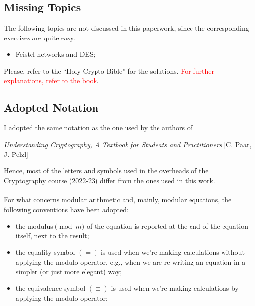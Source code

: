\documentclass[11pt, a4paper]{article}
\newcommand{\doublequotes}[1]{“#1”}
\begin{document}
\subsection*{Missing Topics}
The following topics are not discussed in this paperwork, since the corresponding exercises are quite easy:
\begin{itemize}
    \item Feistel networks and DES;
\end{itemize}
Please, refer to the \doublequotes{Holy Crypto Bible} for the solutions. \textcolor{red}{For further explanations, refer to the book}.

\subsection*{Adopted Notation}
I adopted the same notation as the one used by the authors of
\begin{center}
    \textit{Understanding Cryptography, A Textbook for Students and Practitioners} [C. Paar, J. Pelzl]
\end{center}
Hence, most of the letters and symbols used in the overheads of the Cryptography course (2022-23) differ from the ones used in this work.\\\\
For what concerns modular arithmetic and, mainly, modular equations, the following conventions have been adopted:
\begin{itemize}
    \item the modulus$\pmod m$ of the equation is reported at the end of the equation itself, next to the result;
    \item the equality symbol $(=)$ is used when we're making calculations without applying the modulo operator, e.g., when we are re-writing an equation in a simpler (or just more elegant) way;
    \item the equivalence symbol $(\equiv)$ is used when we're making calculations by applying the modulo operator;
\end{itemize}
\end{document}
